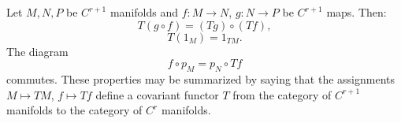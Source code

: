 Let $M, N, P$ be $C^{r+1}$ manifolds and $f: M \to N$, $g: N \to P$ be $C^{r+1}$ maps. Then:
$$T(g \circ f) = (Tg) \circ (Tf),$$
$$T(1_M) = 1_{TM}.$$
The diagram
$$f \circ p_M = p_N \circ Tf$$
commutes. These properties may be summarized by saying that the assignments $M \mapsto TM$, $f \mapsto Tf$ define a covariant functor $T$ from the category of $C^{r+1}$ manifolds to the category of $C^r$ manifolds.
